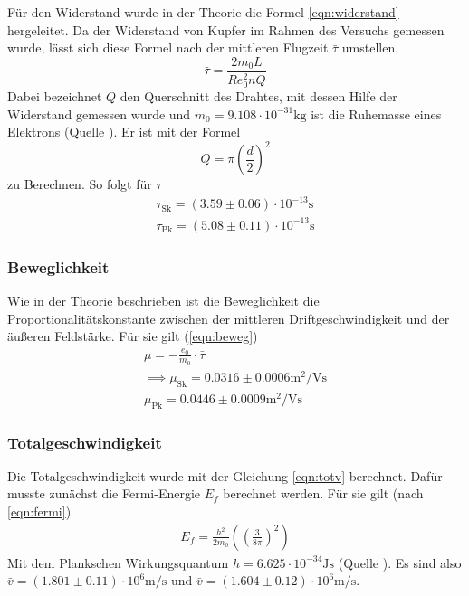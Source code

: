 Für den Widerstand wurde in der Theorie die Formel \eqref{eqn:widerstand} hergeleitet. Da der Widerstand
von Kupfer im Rahmen des Versuchs gemessen wurde, lässt sich diese Formel nach
der mittleren Flugzeit $\bar{\tau}$ umstellen.
\begin{equation*}
\bar{\tau} = \frac{2 m_0 L}{R e_0^2 n Q}
\end{equation*}
Dabei bezeichnet $Q$ den Querschnitt des Drahtes, mit dessen Hilfe der Widerstand gemessen wurde und 
$m_0 = 9.108 \cdot 10^{-31}\si{\kg}$ ist die Ruhemasse eines Elektrons (Quelle \cite{m0}).
Er ist mit der Formel
\begin{equation}
Q = \pi \left( \frac{d}{2} \right)^2
\end{equation}
zu Berechnen. So folgt für $\tau$
\begin{align*}
\tau_\text{Sk} = \left( 3.59 \pm 0.06 \right) \cdot 10^{-13} \si{\s}\\
\tau_\text{Pk} = \left( 5.08 \pm 0.11 \right) \cdot 10^{-13} \si{\s}
\end{align*}

\subsubsection{Beweglichkeit}

Wie in der Theorie beschrieben ist die Beweglichkeit die Proportionalitätskonstante zwischen 
der mittleren Driftgeschwindigkeit und der äußeren Feldstärke. Für sie gilt (\eqref{eqn:beweg})
\begin{align*}
\mu = -\frac{e_0}{m_0} \cdot \bar{\tau} \\
\implies \mu_\text{Sk} = 0.0316 \pm 0.0006 \si{\m\squared\per\V\s} \\
\mu_\text{Pk} = 0.0446 \pm 0.0009 \si{\m\squared\per\V\s}
\end{align*}

\subsubsection{Totalgeschwindigkeit}

Die Totalgeschwindigkeit wurde mit der Gleichung \eqref{eqn:totv} berechnet.
Dafür musste zunächst die Fermi-Energie $E_f$ berechnet werden. Für sie gilt (nach \eqref{eqn:fermi})
\begin{align*}
E_f = \frac{h^2}{2 m_0} \left( \left( \frac{3}{8 \pi} \right)^2 \right)
\end{align*}
Mit dem Plankschen Wirkungsquantum $h = 6.625 \cdot 10^{-34}\si{\joule\s}$ (Quelle \cite{Planck}).
Es sind also $\bar{v} = \left( 1.801 \pm 0.11 \right) \cdot 10^{6} \si{\m\per\s}$ und 
$\bar{v} = \left( 1.604 \pm 0.12 \right) \cdot 10^{6} \si{\m\per\s}$.

